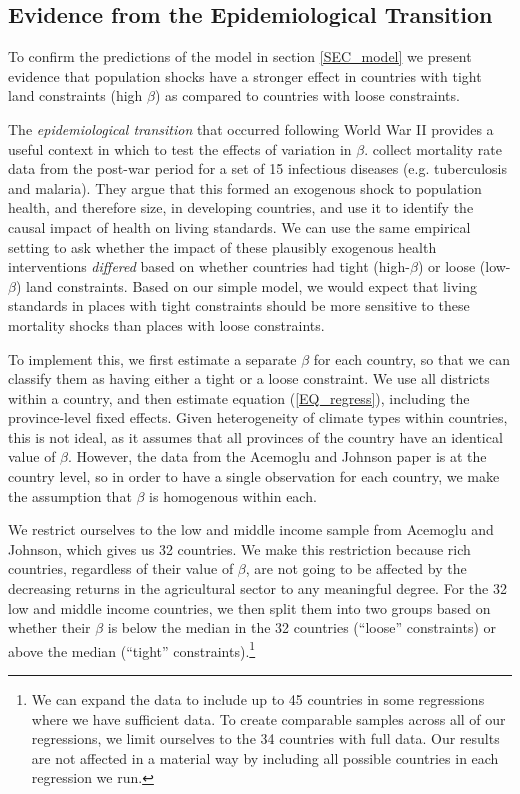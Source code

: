 \documentclass[11pt]{article}
\begin{document}
\subsection{Evidence from the Epidemiological Transition}\label{SEC_ajtest}
To confirm the predictions of the model in section \ref{SEC_model} we present evidence that population shocks have a stronger effect in countries with tight land constraints (high $\beta$) as compared to countries with loose constraints.

The \textit{epidemiological transition} that occurred following World War II provides a useful context in which to test the effects of variation in $\beta$. \cite{aj07} collect mortality rate data from the post-war period for a set of 15 infectious diseases (e.g. tuberculosis and malaria). They argue that this formed an exogenous shock to population health, and therefore size, in developing countries, and use it to identify the causal impact of health on living standards. We can use the same empirical setting to ask whether the impact of these plausibly exogenous health interventions \textit{differed} based on whether countries had tight (high-$\beta$) or loose (low-$\beta$) land constraints. Based on our simple model, we would expect that living standards in places with tight constraints should be more sensitive to these mortality shocks than places with loose constraints.

To implement this, we first estimate a separate $\beta$ for each country, so that we can classify them as having either a tight or a loose constraint. We use all districts within a country, and then estimate equation (\ref{EQ_regress}), including the province-level fixed effects. Given heterogeneity of climate types within countries, this is not ideal, as it assumes that all provinces of the country have an identical value of $\beta$. However, the data from the Acemoglu and Johnson paper is at the country level, so in order to have a single observation for each country, we make the assumption that $\beta$ is homogenous within each.

We restrict ourselves to the low and middle income sample from Acemoglu and Johnson, which gives us 32 countries. We make this restriction because rich countries, regardless of their value of $\beta$, are not going to be affected by the decreasing returns in the agricultural sector to any meaningful degree. For the 32 low and middle income countries, we then split them into two groups based on whether their $\beta$ is below the median in the 32 countries (``loose'' constraints) or above the median (``tight'' constraints).\footnote{We can expand the data to include up to 45 countries in some regressions where we have sufficient data. To create comparable samples across all of our regressions, we limit ourselves to the 34 countries with full data. Our results are not affected in a material way by including all possible countries in each regression we run.}
\end{document}

